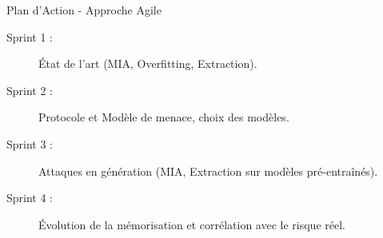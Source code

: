 \documentclass[aspectratio=169, 10pt]{beamer}
\begin{document}
\begin{frame}{Plan d'Action - Approche Agile}
    \begin{description}
        \item[Sprint 1 :] État de l'art (MIA, Overfitting, Extraction).
        \item[Sprint 2 :] Protocole et Modèle de menace, choix des modèles.
        \item[Sprint 3 :] Attaques en génération (MIA, Extraction sur modèles pré-entraînés).
        \item[Sprint 4 :] Évolution de la mémorisation et corrélation avec le risque réel.
    \end{description}
\end{frame}
\end{document}

